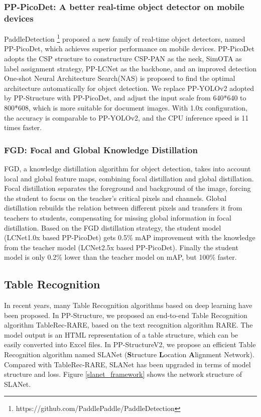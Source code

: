\documentclass[letterpaper]{article} \usepackage{aaai21}  \usepackage{times}  \usepackage{helvet} \usepackage{courier}  \usepackage[hyphens]{url}  \usepackage{graphicx} \usepackage{algorithm}
\begin{document}
\subsubsection{PP-PicoDet: A better real-time object detector on mobile devices}

PaddleDetection \footnote{https://github.com/PaddlePaddle/PaddleDetection} proposed a new family of real-time object detectors, named PP-PicoDet, which achieves superior performance on mobile devices. PP-PicoDet adopts the CSP structure to constructure CSP-PAN as the neck, SimOTA as label assignment strategy, PP-LCNet as the backbone, and an improved detection One-shot Neural Architecture Search(NAS) is proposed to find the optimal architecture automatically for object detection. We replace PP-YOLOv2 adopted by PP-Structure with PP-PicoDet, and 
adjust the input scale from 640*640 to 800*608, which is more suitable for document images. With 1.0x configuration, the accuracy is comparable to PP-YOLOv2, and the CPU inference speed is 11 times faster.

\subsubsection{FGD: Focal and Global Knowledge Distillation}

FGD\cite{fgd}, a knowledge distillation algorithm for object detection, takes into account local and global feature maps, combining focal distillation and global distillation. Focal distillation separates the foreground and background of the image, forcing the student to focus on the teacher’s critical pixels and channels. Global distillation rebuilds the relation between different pixels and transfers it from teachers to students, compensating for missing global information in focal distillation. Based on the FGD distillation strategy, the student model (LCNet1.0x based PP-PicoDet) gets 0.5\% mAP improvement with the knowledge from the teacher model (LCNet2.5x based PP-PicoDet). Finally the student model is only 0.2\% lower than the teacher model on mAP, but 100\% faster.

\subsection{Table Recognition}

In recent years, many Table Recognition algorithms based on deep learning have been proposed. In PP-Structure, we proposed an end-to-end Table Recognition algorithm TableRec-RARE\cite{TableRec-RARE}, based on the text recognition algorithm RARE\cite{rare}. The model output is an HTML representation of a table structure, which can be easily converted into Excel files. In PP-StructureV2, we propose an efficient Table Recognition algorithm named SLANet (\textbf{S}tructure \textbf{L}ocation \textbf{A}lignment Network). Compared with TableRec-RARE, SLANet has been upgraded in terms of model structure and loss. Figure \ref{slanet_framework} shows the network structure of SLANet.
\end{document}
